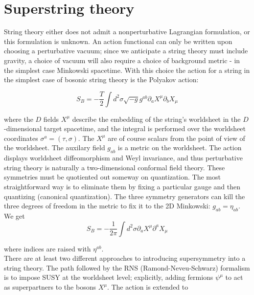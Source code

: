 
\section{Superstring theory}

String theory either does not admit a nonperturbative Lagrangian formulation, or this formulation is unknown. An action functional can only be written upon choosing a perturbative vacuum; since we anticipate a string theory must include gravity, a choice of vacuum will also require a choice of background metric - in the simplest case Minkowski spacetime. With this choice the action for a string in the simplest case of bosonic string theory is the Polyakov action:

\begin{equation}
S_B = -\frac{T}{2} \int d^2\sigma \sqrt{-g} g^{ab} \partial_a X^\mu \partial_b X_\mu
\end{equation}

where the $D$ fields $X^\mu$ describe the embedding of the string's worldsheet in the $D$-dimensional target spacetime, and the integral is performed over the worldsheet coordinates $\sigma^a = (\tau,\sigma)$. The $X^\mu$ are of course scalars from the point of view of the worldsheet. The auxilary field $g_{ab}$ is a metric on the worldsheet. The action displays worldsheet diffeomorphism and Weyl invariance, and thus perturbative string theory is naturally a two-dimensional conformal field theory. These symmetries must be quotiented out someway on quantization. The most straightforward way is to eliminate them by fixing a particular gauge and then quantizing (canonical quantization). The three symmetry generators can kill the three degrees of freedom in the metric to fix it to the 2D Minkowski: $g_{ab} = \eta_{ab}$. We get\\

\begin{equation}
S_B = - \frac{1}{2\pi} \int d^2\sigma \partial_a X^\mu \partial^a X_\mu
\end{equation}

where indices are raised with $\eta^{ab}$.\\

There are at least two different approaches to introducing supersymmetry into a string theory. The path followed by the RNS (Ramond-Neveu-Schwarz) formalism is to impose SUSY at the worldsheet level; explicitly, adding fermions $\psi^\mu$ to act as superpartners to the bosons $X^\mu$. The action is extended to


